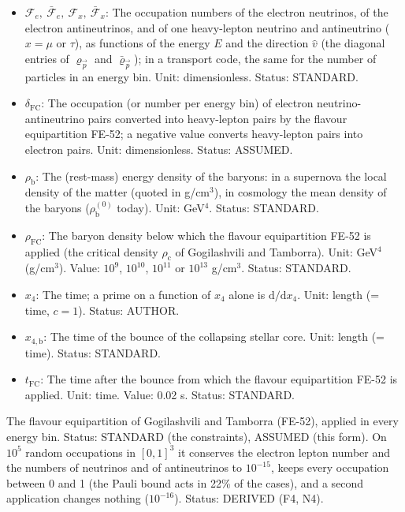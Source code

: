 \documentclass[
  10pt,
]{article}
\providecommand{\tightlist}{%
  \setlength{\itemsep}{0pt}\setlength{\parskip}{0pt}}
\begin{document}
\begin{itemize}
\tightlist
\item
  \(\mathcal{F}_{e},\ \bar{\mathcal{F}}_{e},\ \mathcal{F}_{x},\ \bar{\mathcal{F}}_{x}\):
  The occupation numbers of the electron neutrinos, of the electron
  antineutrinos, and of one heavy-lepton neutrino and antineutrino
  (\(x = \mu\) or \(\tau\)), as functions of the energy \(E\) and the
  direction \(\hat v\) (the diagonal entries of \(\varrho_{\vec p}\) and
  \(\bar\varrho_{\vec p}\)); in a transport code, the same for the
  number of particles in an energy bin. Unit: dimensionless. Status:
  STANDARD.
\item
  \(\delta_{\mathrm{FC}}\): The occupation (or number per energy bin) of
  electron neutrino-antineutrino pairs converted into heavy-lepton pairs
  by the flavour equipartition FE-52; a negative value converts
  heavy-lepton pairs into electron pairs. Unit: dimensionless. Status:
  ASSUMED.
\item
  \(\rho_{\mathrm{b}}\): The (rest-mass) energy density of the baryons:
  in a supernova the local density of the matter (quoted in g/cm\(^3\)),
  in cosmology the mean density of the baryons
  (\(\rho_{\mathrm{b}}^{(0)}\) today). Unit: GeV\(^4\). Status:
  STANDARD.
\item
  \(\rho_{\mathrm{FC}}\): The baryon density below which the flavour
  equipartition FE-52 is applied (the critical density
  \(\rho_{\mathrm{c}}\) of Gogilashvili and Tamborra). Unit: GeV\(^4\)
  (g/cm\(^3\)). Value: \(10^9\), \(10^{10}\), \(10^{11}\) or \(10^{13}\)
  g/cm\(^3\). Status: STANDARD.
\item
  \(x_4\): The time; a prime on a function of \(x_4\) alone is
  \(\mathrm{d}/\mathrm{d}x_4\). Unit: length (= time, \(c = 1\)).
  Status: AUTHOR.
\item
  \(x_{4,\mathrm{b}}\): The time of the bounce of the collapsing stellar
  core. Unit: length (= time). Status: STANDARD.
\item
  \(t_{\mathrm{FC}}\): The time after the bounce from which the flavour
  equipartition FE-52 is applied. Unit: time. Value: 0.02 s. Status:
  STANDARD.
\end{itemize}

The flavour equipartition of Gogilashvili and Tamborra (FE-52), applied
in every energy bin. Status: STANDARD (the constraints), ASSUMED (this
form). On \(10^5\) random occupations in \([0, 1]^3\) it conserves the
electron lepton number and the numbers of neutrinos and of antineutrinos
to \(10^{-15}\), keeps every occupation between 0 and 1 (the Pauli bound
acts in 22\% of the cases), and a second application changes nothing
(\(10^{-16}\)). Status: DERIVED (F4, N4).
\end{document}
